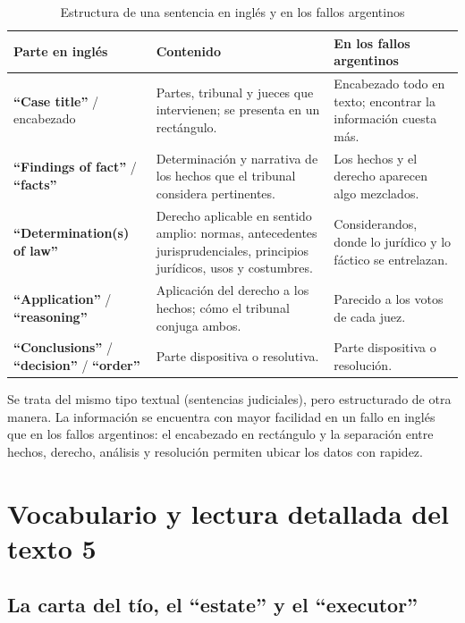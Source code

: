\documentclass[12pt,oneside]{book}
\begin{document}
\begin{table}[H]
\centering
\caption{Estructura de una sentencia en inglés y en los fallos argentinos}
\begin{tabularx}{\textwidth}{
    >{\raggedright\arraybackslash}p{}
    >{\raggedright\arraybackslash}X
    >{\raggedright\arraybackslash}p{}
}
\toprule
\textbf{Parte en inglés} & \textbf{Contenido} & \textbf{En los fallos argentinos} \\
\midrule
\textbf{``Case title''} / encabezado & Partes, tribunal y jueces que intervienen; se presenta en un rectángulo. & Encabezado todo en texto; encontrar la información cuesta más. \\
\textbf{``Findings of fact''} / \textbf{``facts''} & Determinación y narrativa de los hechos que el tribunal considera pertinentes. & Los hechos y el derecho aparecen algo mezclados. \\
\textbf{``Determination(s) of law''} & Derecho aplicable en sentido amplio: normas, antecedentes jurisprudenciales, principios jurídicos, usos y costumbres. & Considerandos, donde lo jurídico y lo fáctico se entrelazan. \\
\textbf{``Application''} / \textbf{``reasoning''} & Aplicación del derecho a los hechos; cómo el tribunal conjuga ambos. & Parecido a los votos de cada juez. \\
\textbf{``Conclusions''} / \textbf{``decision''} / \textbf{``order''} & Parte dispositiva o resolutiva. & Parte dispositiva o resolución. \\
\bottomrule
\end{tabularx}
\end{table}

\begin{note}
Se trata del mismo tipo textual (sentencias judiciales), pero estructurado de otra manera. La información se encuentra con mayor facilidad en un fallo en inglés que en los fallos argentinos: el encabezado en rectángulo y la separación entre hechos, derecho, análisis y resolución permiten ubicar los datos con rapidez.
\end{note}

\section{Vocabulario y lectura detallada del texto 5}

\subsection{\texorpdfstring{La carta del tío, el ``estate'' y el ``executor''}{La carta del tío, el estate y el executor}}
\end{document}
